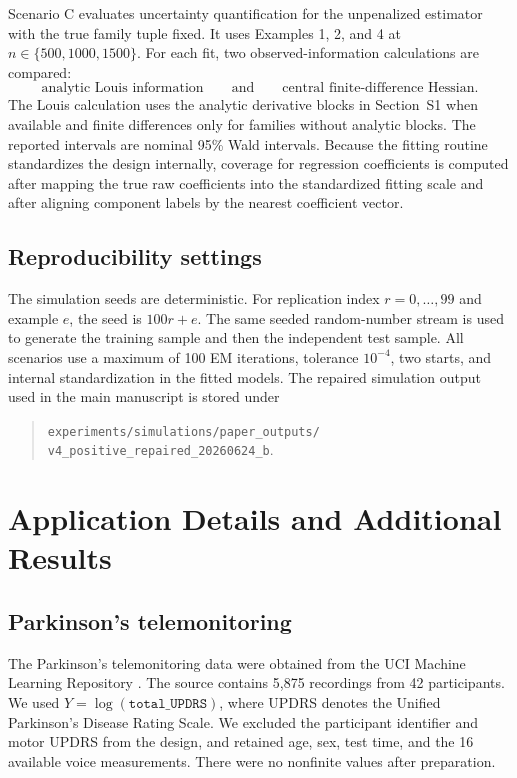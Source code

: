 \documentclass{article}
\begin{document}
Scenario C evaluates uncertainty quantification for the unpenalized estimator
with the true family tuple fixed.  It uses Examples 1, 2, and 4 at
\(n\in\{500,1000,1500\}\).  For each fit, two observed-information calculations
are compared:
\[
    \text{analytic Louis information}
    \qquad\text{and}\qquad
    \text{central finite-difference Hessian}.
\]
The Louis calculation uses the analytic derivative blocks in Section~S1 when
available and finite differences only for families without analytic blocks.
The reported intervals are nominal 95\% Wald intervals.  Because the fitting
routine standardizes the design internally, coverage for regression
coefficients is computed after mapping the true raw coefficients into the
standardized fitting scale and after aligning component labels by the nearest
coefficient vector.

\subsection{Reproducibility settings}

The simulation seeds are deterministic.  For replication index
\(r=0,\ldots,99\) and example \(e\), the seed is \(100r+e\).  The same seeded
random-number stream is used to generate the training sample and then the
independent test sample.  All scenarios use a maximum of 100 EM iterations,
tolerance \(10^{-4}\), two starts, and internal standardization in the fitted
models.  The repaired simulation output used in the main manuscript is stored
under
\begin{quote}
\footnotesize
\texttt{experiments/simulations/paper\_outputs/}\\
\texttt{v4\_positive\_repaired\_20260624\_b}.
\end{quote}

\section{Application Details and Additional Results}
\label{sec:supp_applications}

\subsection{Parkinson's telemonitoring}

The Parkinson's telemonitoring data were obtained from the UCI Machine Learning
Repository \citep{uci2009parkinsons,tsanas2010parkinsons}.  The source contains
5,875 recordings from 42 participants.  We used
\(Y=\log(\mathtt{total\_UPDRS})\), where UPDRS denotes the Unified Parkinson's
Disease Rating Scale.  We excluded the participant identifier and motor UPDRS
from the design, and retained age, sex, test time, and the 16
available voice measurements.  There were no nonfinite values after
preparation.
\end{document}
